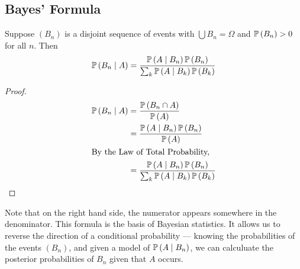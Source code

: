 \subsection{Bayes' Formula}
\begin{claim}
	Suppose \((B_n)\) is a disjoint sequence of events with \(\bigcup B_n = \Omega\) and \(\mathbb{P}\left({B_n}\right) > 0\) for all \(n\). Then
	\[ \mathbb{P}\left({B_n \mid A}\right) = \frac{\mathbb{P}\left({A \mid B_n}\right) \mathbb{P}\left({B_n}\right)}{\sum_k \mathbb{P}\left({A \mid B_k}\right) \mathbb{P}\left({B_k}\right)} \]
\end{claim}
\begin{proof}
	\begin{align*}
		\mathbb{P}\left({B_n \mid A}\right) & = \frac{\mathbb{P}\left({B_n \cap A}\right)}{\mathbb{P}\left({A}\right)}                                       \\
		                  & = \frac{\mathbb{P}\left({A \mid B_n}\right) \mathbb{P}\left({B_n}\right)}{\mathbb{P}\left({A}\right)}                            \\
		\intertext{By the Law of Total Probability,}
		                  & = \frac{\mathbb{P}\left({A \mid B_n}\right) \mathbb{P}\left({B_n}\right)}{\sum_k \mathbb{P}\left({A \mid B_k}\right) \mathbb{P}\left({B_k}\right)}
	\end{align*}
\end{proof}
\noindent Note that on the right hand side, the numerator appears somewhere in the denominator. This formula is the basis of Bayesian statistics. It allows us to reverse the direction of a conditional probability --- knowing the probabilities of the events \((B_n)\), and given a model of \(\mathbb{P}\left({A \mid B_n}\right)\), we can calculuate the posterior probabilities of \(B_n\) given that \(A\) occurs.
